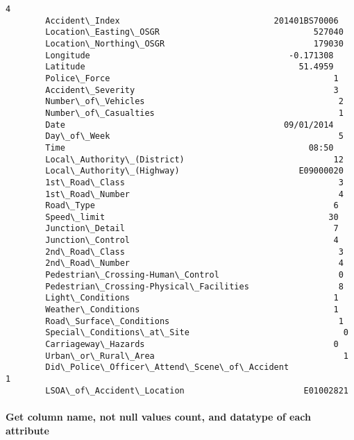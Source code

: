 \documentclass[11pt]{article}
\begin{document}
\begin{Verbatim}[commandchars=\\\{\}]
                                                                 4  
        Accident\_Index                               201401BS70006  
        Location\_Easting\_OSGR                               527040  
        Location\_Northing\_OSGR                              179030  
        Longitude                                        -0.171308  
        Latitude                                           51.4959  
        Police\_Force                                             1  
        Accident\_Severity                                        3  
        Number\_of\_Vehicles                                       2  
        Number\_of\_Casualties                                     1  
        Date                                            09/01/2014  
        Day\_of\_Week                                              5  
        Time                                                 08:50  
        Local\_Authority\_(District)                              12  
        Local\_Authority\_(Highway)                        E09000020  
        1st\_Road\_Class                                           3  
        1st\_Road\_Number                                          4  
        Road\_Type                                                6  
        Speed\_limit                                             30  
        Junction\_Detail                                          7  
        Junction\_Control                                         4  
        2nd\_Road\_Class                                           3  
        2nd\_Road\_Number                                          4  
        Pedestrian\_Crossing-Human\_Control                        0  
        Pedestrian\_Crossing-Physical\_Facilities                  8  
        Light\_Conditions                                         1  
        Weather\_Conditions                                       1  
        Road\_Surface\_Conditions                                  1  
        Special\_Conditions\_at\_Site                               0  
        Carriageway\_Hazards                                      0  
        Urban\_or\_Rural\_Area                                      1  
        Did\_Police\_Officer\_Attend\_Scene\_of\_Accident              1  
        LSOA\_of\_Accident\_Location                        E01002821  
\end{Verbatim}
            
    \paragraph{Get column name, not null values count, and datatype of each
attribute}\label{get-column-name-not-null-values-count-and-datatype-of-each-attribute}
\end{document}
